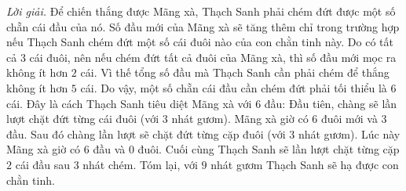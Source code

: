 \begin{multicols}{2}
	\textit{Lời giải.} Để chiến thắng được Mãng xà, Thạch Sanh phải chém đứt được một số chẵn cái đầu của nó. Số đầu mới của Mãng xà sẽ tăng thêm chỉ trong trường hợp nếu Thạch Sanh chém đứt một số cái đuôi nào của con  chằn tinh này. Do có tất cả $3$ cái đuôi, nên nếu chém đứt tất cả đuôi của Mãng xà, thì số đầu mới mọc ra không ít hơn  $2$ cái. Vì thế tổng số đầu mà Thạch Sanh cần phải chém để thắng không ít hơn $5$ cái. Do vậy, một số chẵn cái đầu cần chém đứt phải tối thiểu là $6$ cái. Đây là cách Thạch Sanh tiêu diệt Mãng xà với $6$ đầu: Đầu tiên, chàng sẽ lần lượt chặt đứt từng cái đuôi (với $3$ nhát gươm). Mãng xà giờ có $6$ đuôi mới và $3$ đầu. Sau đó chàng lần lượt sẽ chặt đứt từng cặp đuôi (với $3$ nhát gươm). Lúc này Mãng xà giờ có $6$ đầu và $0$ đuôi. Cuối cùng Thạch Sanh sẽ lần lượt chặt từng cặp $2$ cái đầu sau $3$ nhát chém. Tóm lại, với $9$ nhát gươm Thạch Sanh sẽ hạ được con chằn tinh.
\end{multicols}
\newpage
\begingroup
\thispagestyle{toancuabinone}
